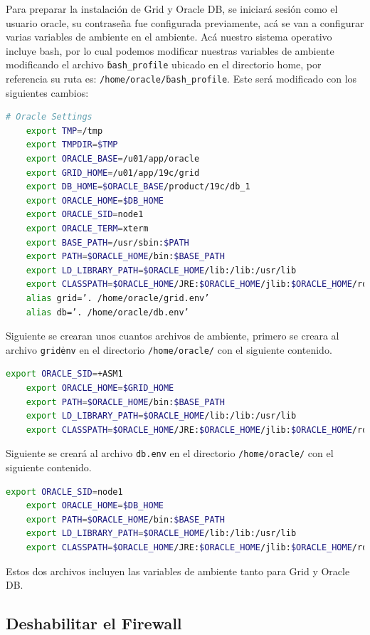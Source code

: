 \documentclass{article}
\begin{document}
Para preparar la instalación de Grid y Oracle DB, se iniciará sesión como el usuario oracle, su contraseña fue configurada previamente, acá se van a configurar varias variables de ambiente en el ambiente. Acá nuestro sistema operativo incluye bash, por lo cual podemos modificar nuestras variables de ambiente modificando el archivo \texttt{\.bash\_profile} ubicado en el directorio home, por referencia su ruta es: \texttt{/home/oracle/\.bash\_profile}. Este será modificado con los siguientes cambios:

\begin{lstlisting}[style=mystyle,language=bash]
	# Oracle Settings
	export TMP=/tmp
	export TMPDIR=$TMP
	export ORACLE_BASE=/u01/app/oracle
	export GRID_HOME=/u01/app/19c/grid
	export DB_HOME=$ORACLE_BASE/product/19c/db_1
	export ORACLE_HOME=$DB_HOME
	export ORACLE_SID=node1
	export ORACLE_TERM=xterm
	export BASE_PATH=/usr/sbin:$PATH
	export PATH=$ORACLE_HOME/bin:$BASE_PATH
	export LD_LIBRARY_PATH=$ORACLE_HOME/lib:/lib:/usr/lib
	export CLASSPATH=$ORACLE_HOME/JRE:$ORACLE_HOME/jlib:$ORACLE_HOME/rdbms/jlib
	alias grid=’. /home/oracle/grid.env’
	alias db=’. /home/oracle/db.env’
\end{lstlisting}

Siguiente se crearan unos cuantos archivos de ambiente, primero se creara al archivo \texttt{grid\.env} en el directorio \texttt{/home/oracle/} con el siguiente contenido.

\begin{lstlisting}[style=mystyle,language=bash]
	export ORACLE_SID=+ASM1
	export ORACLE_HOME=$GRID_HOME
	export PATH=$ORACLE_HOME/bin:$BASE_PATH
	export LD_LIBRARY_PATH=$ORACLE_HOME/lib:/lib:/usr/lib
	export CLASSPATH=$ORACLE_HOME/JRE:$ORACLE_HOME/jlib:$ORACLE_HOME/rdbms/jlib
\end{lstlisting}

Siguiente se creará al archivo \texttt{db.env} en el directorio \texttt{/home/oracle/} con el siguiente contenido.

\begin{lstlisting}[style=mystyle,language=bash]
	export ORACLE_SID=node1
	export ORACLE_HOME=$DB_HOME
	export PATH=$ORACLE_HOME/bin:$BASE_PATH
	export LD_LIBRARY_PATH=$ORACLE_HOME/lib:/lib:/usr/lib
	export CLASSPATH=$ORACLE_HOME/JRE:$ORACLE_HOME/jlib:$ORACLE_HOME/rdbms/jlib
\end{lstlisting}

Estos dos archivos incluyen las variables de ambiente tanto para Grid y Oracle DB.

\subsection{Deshabilitar el Firewall}
\end{document}

